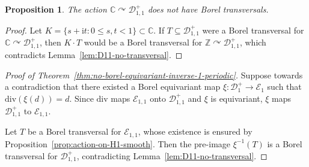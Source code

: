 \documentclass[12pt]{paper}
\numberwithin{equation}{section}
\theoremstyle{plain}
\newtheorem{proposition}[theorem]{Proposition}
\theoremstyle{definition}
\newcommand{\C}{\mathbb{C}}
\newcommand{\Z}{\mathbb{Z}}
\newcommand{\im}{\mathrm{i}} %
\newcommand{\holom}[1][]{\mathcal{E}_{#1}}
\newcommand{\divis}[1][]{\mathcal{D}_{#1}}
\newcommand{\divisp}[1][]{\divis[#1]^{+}}
\newcommand{\dm}{\mathrm{div}}      %
\newcommand{\acts}{\curvearrowright}
\begin{document}
\begin{proposition}
  \label{prop:action-on-D1plus-not-smooth}
  The action \(\C \acts \divisp[1,1]\) does not have Borel transversals.
\end{proposition}

\begin{proof}
  Let \(K = \{s + \im t: 0 \le s, t < 1\} \subset \C\).  If \(T \subseteq \divisp[1,1]\) were a
  Borel transversal for \(\C \acts \divisp[1,1]\), then \(K \cdot T\) would be a Borel transversal
  for \(\Z \acts \divisp[1,1]\), which contradicts Lemma~\ref{lem:D11-no-transversal}.
\end{proof}

\begin{proof}[Proof of Theorem~\ref{thm:no-borel-equivariant-inverse-1-periodic}]
  Suppose towards a contradiction that there existed a Borel equivariant map
  \(\xi:\divisp[1]\to\holom[1]\) such that \(\dm(\xi(d))=d\). Since \(\dm\) maps \(\holom[1,1]\)
  onto \(\divisp[1,1]\) and \(\xi\) is equivariant, \(\xi\) maps \(\divisp[1,1]\) to
  \(\holom[1,1]\).

  Let \(T\) be a Borel transversal for \(\holom[1,1]\), whose existence is ensured by
  Proposition~\ref{prop:action-on-H1-smooth}. Then the pre-image \(\xi^{-1}(T)\) is a Borel
  transversal for \(\divisp[1,1]\), contradicting Lemma~\ref{lem:D11-no-transversal}.
\end{proof}
\end{document}
